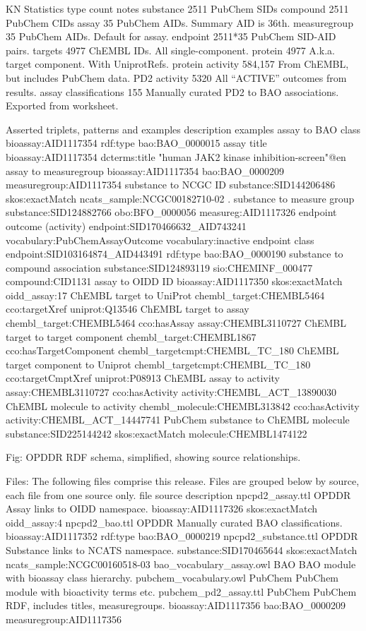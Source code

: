 KN Statistics
type
count
notes
substance
2511
PubChem SIDs
compound
2511
PubChem CIDs
assay
35
PubChem AIDs.  Summary AID is 36th.
measuregroup
35
PubChem AIDs.  Default for assay.
endpoint
2511*35
PubChem SID-AID pairs.
targets
4977
ChEMBL IDs.  All single-component.
protein
4977
A.k.a. target component.  With UniprotRefs.
protein activity
584,157
From ChEMBL, but includes PubChem data.
PD2 activity
5320
All “ACTIVE” outcomes from results.
assay classifications
155
Manually curated PD2 to BAO associations.  Exported from worksheet.

Asserted triplets, patterns and examples 
description
examples
assay to BAO class
bioassay:AID1117354 rdf:type bao:BAO\_0000015
assay title
bioassay:AID1117354 dcterms:title "human JAK2 kinase inhibition-screen"@en
assay to measuregroup
bioassay:AID1117354 bao:BAO\_0000209 measuregroup:AID1117354
substance to NCGC ID
substance:SID144206486 skos:exactMatch ncats\_sample:NCGC00182710-02 .
substance to measure group
substance:SID124882766 obo:BFO\_0000056 measureg:AID1117326
endpoint outcome (activity)
endpoint:SID170466632\_AID743241 vocabulary:PubChemAssayOutcome vocabulary:inactive
endpoint class
endpoint:SID103164874\_AID443491 rdf:type bao:BAO\_0000190
substance to compound association
substance:SID124893119 sio:CHEMINF\_000477 compound:CID1131
assay to OIDD ID
bioassay:AID1117350 skos:exactMatch  oidd\_assay:17
ChEMBL target to UniProt
chembl\_target:CHEMBL5464 cco:targetXref uniprot:Q13546
ChEMBL target to assay
chembl\_target:CHEMBL5464 cco:hasAssay assay:CHEMBL3110727
ChEMBL target to target component
chembl\_target:CHEMBL1867 cco:hasTargetComponent chembl\_targetcmpt:CHEMBL\_TC\_180
ChEMBL target component to Uniprot
chembl\_targetcmpt:CHEMBL\_TC\_180 cco:targetCmptXref uniprot:P08913
ChEMBL assay to activity
assay:CHEMBL3110727 cco:hasActivity activity:CHEMBL\_ACT\_13890030
ChEMBL molecule to activity
chembl\_molecule:CHEMBL313842 cco:hasActivity activity:CHEMBL\_ACT\_14447741
PubChem substance to ChEMBL molecule
substance:SID225144242 skos:exactMatch molecule:CHEMBL1474122 

Fig: OPDDR RDF schema, simplified, showing source relationships.

Files:
The following files comprise this release.  Files are grouped below by source, each file from one source only.
file
source
description
npcpd2\_assay.ttl
OPDDR
Assay links to OIDD namespace.
bioassay:AID1117326 skos:exactMatch oidd\_assay:4
npcpd2\_bao.ttl
OPDDR
Manually curated BAO classifications.
bioassay:AID1117352 rdf:type bao:BAO\_0000219
npcpd2\_substance.ttl
OPDDR
Substance links to NCATS namespace.
substance:SID170465644 skos:exactMatch ncats\_sample:NCGC00160518-03
bao\_vocabulary\_assay.owl
BAO
BAO module with bioassay class hierarchy. 
pubchem\_vocabulary.owl
PubChem
PubChem module with bioactivity terms etc.
pubchem\_pd2\_assay.ttl
PubChem
PubChem RDF, includes titles, measuregroups.
bioassay:AID1117356 bao:BAO\_0000209 measuregroup:AID1117356

